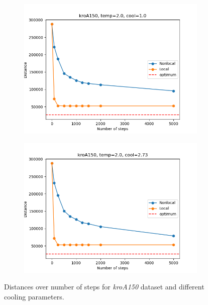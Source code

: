 \begin{figure}[!htb]
	\centering
	\begin{subfigure}{0.45\textwidth}
		\includegraphics[width=\textwidth]{img/kroA150_temp=2.0_cool=1.0}
	\end{subfigure}
	\begin{subfigure}{0.45\textwidth}
		\includegraphics[width=\textwidth]{img/kroA150_temp=2.0_cool=2.73}
	\end{subfigure}
	\caption{Distances over number of steps for \textit{kroA150} dataset and different cooling parameters.}
	\label{fig:kroA150_comp}
\end{figure}

